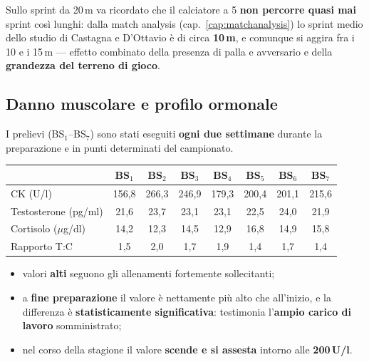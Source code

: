Sullo sprint da 20\,m va ricordato che il calciatore a 5 \textbf{non percorre quasi mai} sprint
così lunghi: dalla match analysis (cap.~\ref{cap:matchanalysis}) lo sprint medio dello studio di
Castagna e D'Ottavio è di circa \textbf{10\,m}, e comunque si aggira fra i 10 e i 15\,m --- effetto
combinato della presenza di palla e avversario e della \textbf{grandezza del terreno di gioco}.

\subsection{Danno muscolare e profilo ormonale}

I prelievi (BS$_1$--BS$_7$) sono stati eseguiti \textbf{ogni due settimane} durante la
preparazione e in punti determinati del campionato.

\begin{table}[htbp]
  \centering
  \small
  \renewcommand{\arraystretch}{1.3}
  \begin{tabularx}{\textwidth}{|X|c|c|c|c|c|c|c|}
    \hline
    & \textbf{BS$_1$} & \textbf{BS$_2$} & \textbf{BS$_3$} & \textbf{BS$_4$} & \textbf{BS$_5$} &
      \textbf{BS$_6$} & \textbf{BS$_7$} \\
    \hline
    CK (U/l) & 156,8 & 266,3 & 246,9 & 179,3 & 200,4 & 201,1 & 215,6 \\
    \hline
    Testosterone (pg/ml) & 21,6 & 23,7 & 23,1 & 23,1 & 22,5 & 24,0 & 21,9 \\
    \hline
    Cortisolo ($\mu$g/dl) & 14,2 & 12,3 & 14,5 & 12,9 & 16,8 & 14,9 & 15,8 \\
    \hline
    Rapporto T:C & 1,5 & 2,0 & 1,7 & 1,9 & 1,4 & 1,7 & 1,4 \\
    \hline
  \end{tabularx}
\end{table}

\begin{itemize}
  \item valori \textbf{alti} seguono gli allenamenti fortemente sollecitanti;
  \item a \textbf{fine preparazione} il valore è nettamente più alto che all'inizio, e la
    differenza è \textbf{statisticamente significativa}: testimonia l'\textbf{ampio carico di
    lavoro} somministrato;
  \item nel corso della stagione il valore \textbf{scende e si assesta} intorno alle
    \textbf{200\,U/l}.
\end{itemize}


